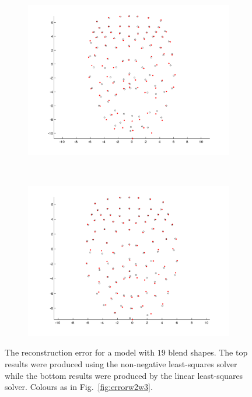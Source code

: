 \documentclass[11pt]{report}
\begin{document}
\begin{figure}[htbp!]
        ~ %
        \begin{subfigure}[b]{0.3\textwidth}
                \includegraphics[trim = 10mm 0mm 10mm 0mm,clip,width=\textwidth]{img/weights/3D/19blends/w3_frame400_blends19.png}
        \end{subfigure}
        ~ %
        \begin{subfigure}[b]{0.3\textwidth}
                \includegraphics[trim = 10mm 0mm 10mm 0mm,clip,width=\textwidth]{img/weights/3D/19blends/w3_frame600_blends19.png} 
        \end{subfigure}
        \caption{The reconstruction error for a model with $19$ blend shapes. The top results were produced using the non-negative least-squares solver while the bottom results were produced by the linear least-squares solver. Colours as in Fig.~\ref{fig:errorw2w3}.}\label{fig:19blends}
\end{figure}
\end{document}
